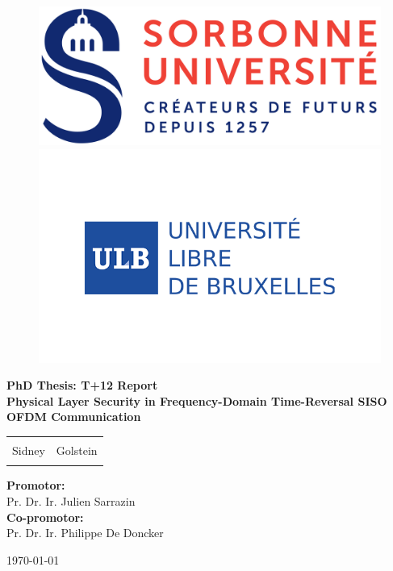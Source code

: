 \begin{titlepage}
\graphicspath{{00_frontmatter/}}


\begin{figure}[!htb]
    \centering
        \includegraphics[width=0.55\linewidth]{img/sorbonne_logo.png}
    \endminipage 
    \centering
        \includegraphics[width=0.8\linewidth]{img/logo_ulb.png}
    \endminipage
\end{figure} 

\begin{center}

\huge{\bf{PhD Thesis: T+12 Report}}\\[0.5in]

\LARGE{ \textbf {Physical Layer Security in Frequency-Domain Time-Reversal SISO OFDM Communication}}\\[0.5in]


\begin{table}[h]
\begin{center}
\begin{tabular}{ll}\hline \\

\Large{Sidney} & \Large{Golstein} \\ \\
\hline 
\end{tabular}
\end{center}
\end{table}

\vspace{0.5in}
\Large{\textbf{Promotor:}}\\
\Large{Pr. Dr. Ir. Julien Sarrazin}\\[0.3in]
\Large{\textbf{Co-promotor:}} \\
\Large{Pr. Dr. Ir. Philippe De Doncker}\\[0.1in]

\vspace{1.3in}


\vfill

\Large{\hfill{\today}}


\end{center}

\end{titlepage}
